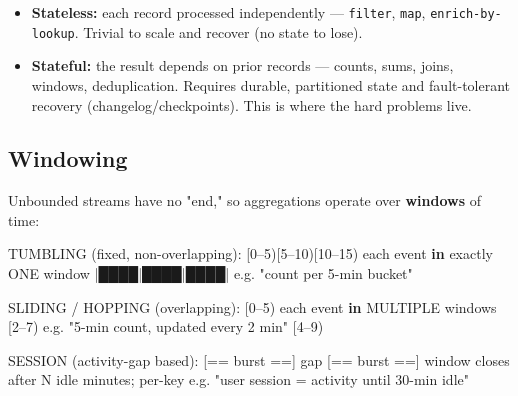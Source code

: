 \documentclass[11pt]{article}
\providecommand{\tightlist}{\setlength{\itemsep}{1pt}\setlength{\parskip}{0pt}}
\newenvironment{Shaded}{\begin{snugshade}}{\end{snugshade}}
\newcommand{\DecValTok}[1]{\textcolor[rgb]{0.96,0.45,0.00}{#1}}
\newcommand{\KeywordTok}[1]{\textcolor[rgb]{0.81,0.81,0.76}{\textbf{#1}}}
\newcommand{\NormalTok}[1]{\textcolor[rgb]{0.81,0.81,0.76}{#1}}
\newcommand{\OperatorTok}[1]{\textcolor[rgb]{0.81,0.81,0.76}{#1}}
\newcommand{\StringTok}[1]{\textcolor[rgb]{0.96,0.31,0.31}{#1}}
\begin{document}
\begin{itemize}
\tightlist
\item
  \textbf{Stateless:} each record processed independently --- \texttt{filter}, \texttt{map}, \texttt{enrich-by-lookup}. Trivial to scale and recover (no state to lose).
\item
  \textbf{Stateful:} the result depends on prior records --- counts, sums, joins, windows, deduplication. Requires durable, partitioned state and fault-tolerant recovery (changelog/checkpoints). This is where the hard problems live.
\end{itemize}

\subsection{Windowing}\label{windowing}

Unbounded streams have no "end," so aggregations operate over \textbf{windows} of time:


\begin{Shaded}
\begin{Highlighting}[]
\NormalTok{TUMBLING (fixed, non}\OperatorTok{{-}}\NormalTok{overlapping):   [}\DecValTok{0}\NormalTok{–}\DecValTok{5}\NormalTok{)[}\DecValTok{5}\NormalTok{–}\DecValTok{10}\NormalTok{)[}\DecValTok{10}\NormalTok{–}\DecValTok{15}\NormalTok{)   each event }\KeywordTok{in}\NormalTok{ exactly ONE window}
                                     \OperatorTok{|}\NormalTok{████}\OperatorTok{|}\NormalTok{████}\OperatorTok{|}\NormalTok{████}\OperatorTok{|}\NormalTok{     e.g. }\StringTok{"count per 5{-}min bucket"}

\NormalTok{SLIDING }\OperatorTok{/}\NormalTok{ HOPPING (overlapping):     [}\DecValTok{0}\NormalTok{–}\DecValTok{5}\NormalTok{)                each event }\KeywordTok{in}\NormalTok{ MULTIPLE windows}
\NormalTok{                                       [}\DecValTok{2}\NormalTok{–}\DecValTok{7}\NormalTok{)               e.g. }\StringTok{"5{-}min count, updated every 2 min"}
\NormalTok{                                         [}\DecValTok{4}\NormalTok{–}\DecValTok{9}\NormalTok{)}

\NormalTok{SESSION (activity}\OperatorTok{{-}}\NormalTok{gap based):        [}\OperatorTok{==}\NormalTok{ burst }\OperatorTok{==}\NormalTok{]  gap   [}\OperatorTok{==}\NormalTok{ burst }\OperatorTok{==}\NormalTok{]}
\NormalTok{                                     window closes after N idle minutes}\OperatorTok{;}\NormalTok{ per}\OperatorTok{{-}}\NormalTok{key}
\NormalTok{                                     e.g. }\StringTok{"user session = activity until 30{-}min idle"}
\end{Highlighting}
\end{Shaded}
\end{document}
